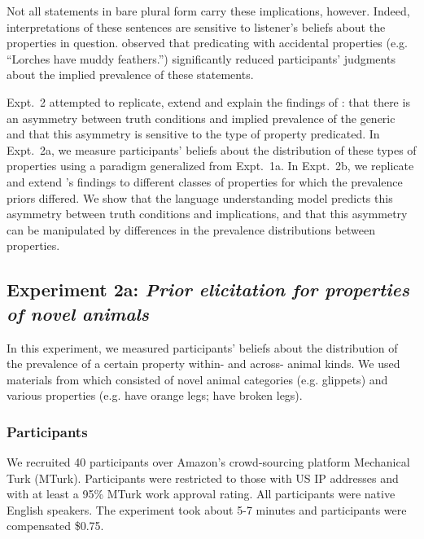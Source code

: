 \documentclass[10pt,letterpaper]{article}
\begin{document}
Not all statements in bare plural form carry these implications, however. 
Indeed, interpretations of these sentences are sensitive to listener's beliefs about the properties in question. 
 observed that predicating with accidental properties (e.g. ``Lorches have muddy feathers.'') significantly reduced participants' judgments about the implied prevalence of these statements.


Expt.~2 attempted to replicate, extend and explain the findings of : that there is an asymmetry between truth conditions and implied prevalence of the generic and that this asymmetry is sensitive to the type of property predicated. 
In Expt.~2a, we measure participants' beliefs about the distribution of these types of properties using a paradigm generalized from Expt.~1a. 
In Expt.~2b, we replicate and extend \citeauthor{Cimpian2010}'s findings to different classes of properties for which the prevalence priors differed. 
We show that the language understanding model predicts this asymmetry between truth conditions and implications, and that this asymmetry can be manipulated by differences in the prevalence distributions between properties.



\subsection{Experiment 2a: \emph{Prior elicitation for properties of novel animals}}

In this experiment, we measured participants' beliefs about the distribution of the prevalence of a certain property within- and across- animal kinds. 
We used materials from  which consisted of novel animal categories (e.g. glippets) and various properties (e.g. have orange legs; have broken legs).


\subsubsection{Participants}

We recruited 40 participants over Amazon's crowd-sourcing platform Mechanical Turk (MTurk).  Participants were restricted to those with US IP addresses and with at least a 95\% MTurk work approval rating. All participants were native English speakers. The experiment took about 5-7 minutes and participants were compensated \$0.75.
\end{document}
